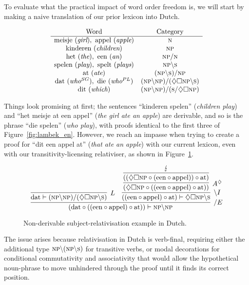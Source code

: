 To evaluate what the practical impact of word order freedom is, we will start by making a naive translation of our prior lexicon into Dutch.

 \[
 \begin{array}{cc}
 \text{Word} & \text{Category} \\
 \hline
 \text{meisje}\ (\textit{girl}), \ \text{appel} \ (\textit{apple}) & \textsc{n} \\
 \text{kinderen} \ (\textit{children}) & \textsc{np} \\
 \text{het} \ (\textit{the}) , \ \text{een} \ (\textit{an}) & \textsc{np}/ \textsc{n} \\
 \text{spelen} \ (\textit{play}), \ \text{spelt} \ (\textit{plays}) & \textsc{np}\backslash \textsc{s} \\
 \text{at} \ (\textit{ate}) & (\textsc{np} \backslash \textsc{s}) / \textsc{np} \\ 
 \text{dat} \ (\textit{who$^{SG}$}), \ \text{die} \ (\textit{who$^{PL}$}) & (\textsc{np} \backslash \textsc{np}) / (\diamondsuit \Box \textsc{np} \backslash \textsc{s}) \\
 \text{dit} \ (\textit{which}) & (\textsc{np} \backslash \textsc{np})/(\textsc{s} / \diamondsuit \Box \textsc{np})
 \end{array}
 \]

Things look promising at first; the sentences ``kinderen spelen'' (\textit{children play}) and ``het meisje at een appel''  (\textit{the girl ate an apple}) are derivable, and so is the phrase ``die spelen'' (\textit{who play}), with proofs identical to the first three of Figure~\ref{fig:lambek_en}.
However, we reach an impasse when trying to create a proof for ``dit een appel at'' (\textit{that ate an apple}) with our current lexicon, even with our transitivity-licensing relativiser, as shown in Figure~\ref{fig:nl_dutch}.
\begin{figure}
	\centering
		\[
		\infer[/E]{(\text{dat} \circ ((\text{een} \circ \text{appel}) \circ \text{at})) \vdash \textsc{np}\backslash \textsc{np}}{
			\infer[L]{\text{dat} \vdash (\textsc{np} \backslash \textsc{np}) / (\diamondsuit \Box \textsc{np} \backslash \textsc{s})}{}
			&
			\infer[\backslash I]{((\text{een} \circ \text{appel}) \circ \text{at}) \vdash \diamondsuit \Box \textsc{np}\backslash \textsc{s}}{
				\infer[A^\diamondsuit]{(\diamondsuit \Box \textsc{np} \circ ((\text{een} \circ \text{appel}) \circ \text{at}))}{
					\infer[]{((\diamondsuit \Box \textsc{np} \circ (\text{een} \circ \text{appel})) \circ \text{at})}{\lightning}
				}
			}
		}
		\]
\caption[Dutch non-derivable Example]{Non-derivable subject-relativisation example in Dutch.}
\label{fig:nl_dutch}
\end{figure}
The issue arises because relativisation in Dutch is verb-final, requiring either the additional type $\textsc{np}\backslash(\textsc{np}\backslash\textsc{s})$ for transitive verbs, or modal decorations for conditional commutativity and associativity that would allow the hypothetical noun-phrase to move unhindered through the proof until it finds its correct position.

